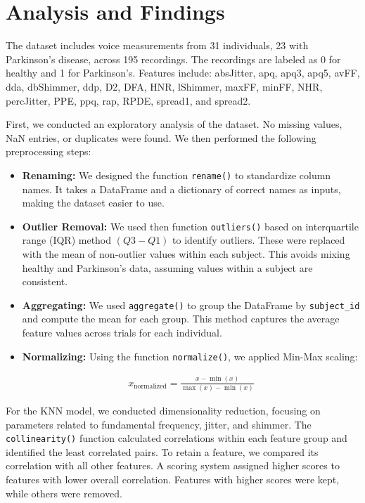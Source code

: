 \section{Analysis and Findings}

The dataset includes voice measurements from 31 individuals, 23 with
Parkinson's disease, across 195 recordings. The recordings are labeled as 0 for
healthy and 1 for Parkinson's. Features include: absJitter, apq, apq3, apq5,
avFF, dda, dbShimmer, ddp, D2, DFA, HNR, lShimmer, maxFF, minFF, NHR,
percJitter, PPE, ppq, rap, RPDE, spread1, and spread2.

First, we conducted an exploratory analysis of the dataset. No missing values,
NaN entries, or duplicates were found. We then performed the following
preprocessing steps:

\begin{itemize}
	\item \textbf{Renaming:} We designed the function \texttt{rename()} to
	      standardize column names. It takes a DataFrame and a dictionary of correct
	      names as inputs, making the dataset easier to use.

	\item \textbf{Outlier Removal:} We used then function \texttt{outliers()}
	      based on interquartile range (IQR) method \((Q3 - Q1)\) to identify
	      outliers. These were replaced with the mean of non-outlier values within
	      each subject. This avoids mixing healthy and Parkinson's data, assuming
	      values within a subject are consistent.

	\item \textbf{Aggregating:} We used \texttt{aggregate()} to group the
	      DataFrame by \texttt{subject\_id} and compute the mean for each group. This
	      method captures the average feature values across trials for each individual.

	\item \textbf{Normalizing:} Using the function \texttt{normalize()}, we
	      applied Min-Max scaling:

	      \begin{align} x_{\text{normalized}} = \frac{x - \min(x)}{\max(x) - \min(x)}
	      \end{align}
\end{itemize}

For the KNN model, we conducted dimensionality reduction, focusing on
parameters related to fundamental frequency, jitter, and shimmer. The
\texttt{collinearity()} function calculated correlations within each feature
group and identified the least correlated pairs. To retain a feature, we
compared its correlation with all other features. A scoring system assigned
higher scores to features with lower overall correlation. Features with higher
scores were kept, while others were removed.

